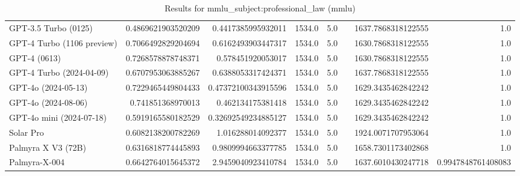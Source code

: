 \begin{table}[htp]
{\begin{tabular}{lrrrrrrr}
GPT-3.5 Turbo (0125) & 0.4869621903520209 & 0.4417385995932011 & 1534.0 & 5.0 &  & 1637.7868318122555 & 1.0 \\
GPT-4 Turbo (1106 preview) & 0.7066492829204694 & 0.6162493903447317 & 1534.0 & 5.0 &  & 1630.7868318122555 & 1.0 \\
GPT-4 (0613) & 0.7268578878748371 & 0.578451920053017 & 1534.0 & 5.0 &  & 1630.7868318122555 & 1.0 \\
GPT-4 Turbo (2024-04-09) & 0.6707953063885267 & 0.6388053317424371 & 1534.0 & 5.0 &  & 1637.7868318122555 & 1.0 \\
GPT-4o (2024-05-13) & 0.7229465449804433 & 0.47372100343915596 & 1534.0 & 5.0 &  & 1629.3435462842242 & 1.0 \\
GPT-4o (2024-08-06) & 0.741851368970013 & 0.462134175381418 & 1534.0 & 5.0 &  & 1629.3435462842242 & 1.0 \\
GPT-4o mini (2024-07-18) & 0.5919165580182529 & 0.32692549234885127 & 1534.0 & 5.0 &  & 1629.3435462842242 & 1.0 \\
Solar Pro & 0.6082138200782269 & 1.016288014092377 & 1534.0 & 5.0 &  & 1924.0071707953064 & 1.0 \\
Palmyra X V3 (72B) & 0.6316818774445893 & 0.9809994663377785 & 1534.0 & 5.0 &  & 1658.7301173402868 & 1.0 \\
Palmyra-X-004 & 0.6642764015645372 & 2.9459040923410784 & 1534.0 & 5.0 &  & 1637.6010430247718 & 0.9947848761408083 \\
\bottomrule
\end{tabular}}
\caption{Results for mmlu_subject:professional_law (mmlu)}
\label{fig:mmlu_subject:professional_law (mmlu)}
\end{table}